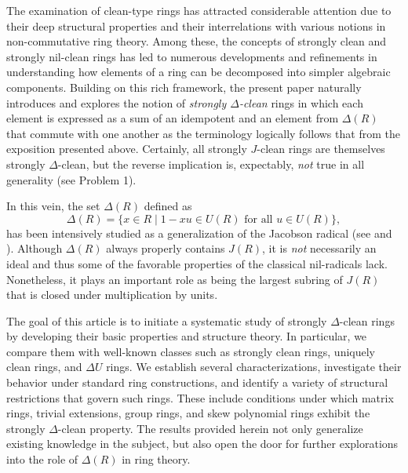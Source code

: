 \documentclass[12pt]{amsart}
\theoremstyle{definition}
\begin{document}
The examination of clean-type rings has attracted considerable attention due to their deep structural properties and their interrelations with various notions in non-commutative ring theory. Among these, the concepts of strongly clean and strongly nil-clean rings has led to numerous developments and refinements in understanding how elements of a ring can be decomposed into simpler algebraic components. Building on this rich framework, the present paper naturally introduces and explores the notion of \textit{strongly $\Delta$-clean} rings in which each element is expressed as a sum of an idempotent and an element from $\Delta(R)$ that commute with one another as the terminology logically follows that from the exposition presented above. Certainly, all strongly $J$-clean rings are themselves strongly $\Delta$-clean, but the reverse implication is, expectably, {\it not} true in all generality (see Problem 1).

In this vein, the set $\Delta(R)$ defined as
\[
\Delta(R) = \{x \in R \mid 1 - xu \in U(R) \text{ for all } u \in U(R)\},
\]
has been intensively studied as a generalization of the Jacobson radical (see \cite[Exercise 4.24]{lame} and \cite{lmr}). Although $\Delta(R)$ always properly contains $J(R)$, it is {\it not} necessarily an ideal and thus some of the favorable properties of the classical nil-radicals lack. Nonetheless, it plays an important role as being the largest subring of $J(R)$ that is closed under multiplication by units.

The goal of this article is to initiate a systematic study of strongly $\Delta$-clean rings by developing their basic properties and structure theory. In particular, we compare them with well-known classes such as strongly clean rings, uniquely clean rings, and $\Delta U$ rings. We establish several characterizations, investigate their behavior under standard ring constructions, and identify a variety of structural restrictions that govern such rings. These include conditions under which matrix rings, trivial extensions, group rings, and skew polynomial rings exhibit the strongly $\Delta$-clean property. The results provided herein not only generalize existing knowledge in the subject, but also open the door for further explorations into the role of $\Delta(R)$ in ring theory.
\end{document}
